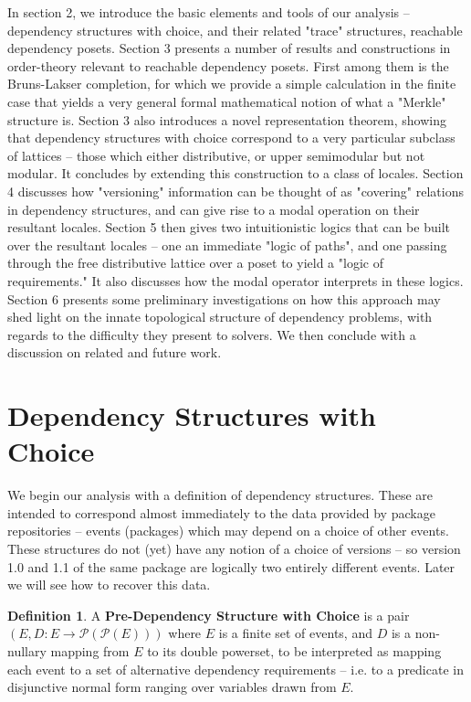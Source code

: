 \documentclass[hoptionsi,review,format=acmsmall]{acmart}
\theoremstyle{definition}
\newtheorem{definition}{Definition}[section]
\newcommand{\Pc}{\mathcal{P}}
\begin{document}
In section 2, we introduce the basic elements and tools of our analysis -- dependency structures with choice, and their related "trace" structures, reachable dependency posets. Section 3 presents a number of results and constructions in order-theory relevant to reachable dependency posets. First among them is the Bruns-Lakser completion, for which we provide a simple calculation in the finite case that yields a very general formal mathematical notion of what a "Merkle" structure is. Section 3 also introduces a novel representation theorem, showing that dependency structures with choice correspond to a very particular subclass of lattices -- those which either distributive, or upper semimodular but not modular. It concludes by extending this construction to a class of locales. Section 4 discusses how "versioning" information can be thought of as "covering" relations in dependency structures, and can give rise to a modal operation on their resultant locales. Section 5 then gives  two intuitionistic logics that can be built over the resultant locales  -- one an immediate "logic of paths", and one passing through the free distributive lattice over a poset to yield a "logic of requirements." It also discusses how the modal operator interprets in these logics. Section 6 presents some preliminary investigations on how this approach may shed light on the innate topological structure of dependency problems, with regards to the difficulty they present to solvers. We then conclude with a discussion on related and future work.

\section{Dependency Structures with Choice}
We begin our analysis with a definition of dependency structures. These are intended to correspond almost immediately to the data provided by package repositories -- events (packages) which may depend on a choice of other events. These structures do not (yet) have any notion of a choice of versions -- so version 1.0 and 1.1 of the same package are logically two entirely different events. Later we will see how to recover this data.

\begin{definition}
A \textbf{Pre-Dependency Structure with Choice} is a pair \((E, D : E \rightarrow \Pc(\Pc(E)))\) where \(E\) is a finite set of events, and \(D\) is a non-nullary mapping from \(E\) to its double powerset, to be interpreted as mapping each event to a set of alternative dependency requirements -- i.e. to a predicate in disjunctive normal form ranging over variables drawn from \(E\).
\end{definition}
\end{document}
